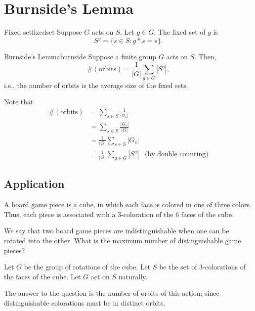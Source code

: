 \section{Burnside's Lemma}

\begin{defn}{Fixed set}{fixedset}
  Suppose \(G\) acts on \(S\). Let \(g \in G\). The fixed set of \(g\) is \[
    S^g = \{s \in S : g*s = s\}.
  \] 
\end{defn}

\begin{thm}{Burnside's Lemma}{burnside}
  Suppose a finite group \(G\) acts on \(S\). Then, \[
    \#(\text{orbits}) = \frac{1}{|G|} \sum_{g \in G} |S^g|,
  \] 
  i.e., the number of orbits is the average size of the fixed sets.
\end{thm}

\begin{dem}{}{}
  Note that
  \begin{align*}
	\#(\text{orbits}) &= \sum_{s \in S} \frac{1}{\left|\mathcal{O}_s\right|} \\
					  &= \sum_{s \in S} \frac{\left|G_s\right|}{\left|G\right|} \\
					  &= \frac{1}{\left|G\right|} \sum_{s \in S} \left|G_s\right| \\
                      &= \frac{1}{\left|G\right|} \sum_{g \in G} \left|S^g\right| & \text{(by double counting)}
  \end{align*}
\end{dem}

\subsection*{Application}

\begin{que}{}{}
A board game piece is a cube, in which each face is colored in one of three colors.
Thus, each piece is associated with a \(3\)-coloration of the \(6\) faces of the cube. 

We say that two board game pieces are indistinguishable when one can be rotated into the other. What is the maximum number of distinguishable game pieces?
\end{que}

Let \(G\) be the group of rotations of the cube.
Let \(S\) be the set of \(3\)-colorations of the faces of the cube.
Let \(G\) act on \(S\) naturally.

The answer to the question is the number of orbits of this action; since distinguishable colorations must be in distinct orbits.

